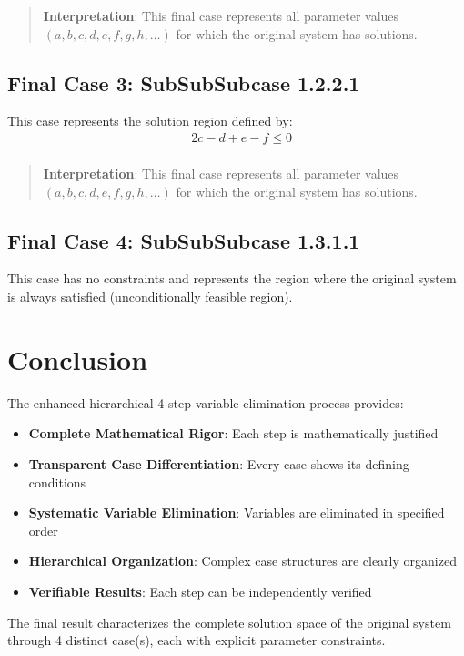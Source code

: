 \documentclass{article}
\newenvironment{stepdetail}
  {\begin{quote}\small\color{blue}}
  {\end{quote}}
\begin{document}
\begin{stepdetail}
\textbf{Interpretation}: This final case represents all parameter values
$(a, b, c, d, e, f, g, h, \ldots)$ for which the original system has solutions.
\end{stepdetail}

\subsection{Final Case 3: SubSubSubcase 1.2.2.1}

This case represents the solution region defined by:
\begin{align}
& 2 c - d + e - f \leq 0 \\
\end{align}

\begin{stepdetail}
\textbf{Interpretation}: This final case represents all parameter values
$(a, b, c, d, e, f, g, h, \ldots)$ for which the original system has solutions.
\end{stepdetail}

\subsection{Final Case 4: SubSubSubcase 1.3.1.1}

This case has no constraints and represents the region where the original
system is always satisfied (unconditionally feasible region).

\section{Conclusion}

The enhanced hierarchical 4-step variable elimination process provides:
\begin{itemize}
\item \textbf{Complete Mathematical Rigor}: Each step is mathematically justified
\item \textbf{Transparent Case Differentiation}: Every case shows its defining conditions
\item \textbf{Systematic Variable Elimination}: Variables are eliminated in specified order
\item \textbf{Hierarchical Organization}: Complex case structures are clearly organized
\item \textbf{Verifiable Results}: Each step can be independently verified
\end{itemize}

The final result characterizes the complete solution space of the original system
through 4 distinct case(s), each with explicit parameter constraints.
\end{document}
